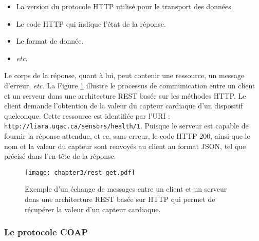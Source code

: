 \begin{itemize}[label=\textbullet]
    \item
        La version du protocole \ac{HTTP} utilisé pour le transport des données.
    \item
        Le code \ac{HTTP} \citep{Fielding2014} qui indique l'état de la réponse.
    \item
        Le format de donnée.
    \item
        \textit{etc.}
\end{itemize}

\noindent Le corps de la réponse, quant à lui, peut contenir une ressource, un message d'erreur, \textit{etc.} La Figure \ref{fig:rest_get} illustre le processus de communication entre un client et un serveur dans une architecture \ac{REST} basée sur les méthodes \ac{HTTP}. Le client demande l'obtention de la valeur du capteur cardiaque d'un dispositif quelconque. Cette ressource est identifiée par l'\ac{URI} : \texttt{http://liara.uqac.ca/sensors/health/1}. Puisque le serveur est capable de fournir la réponse attendue, et ce, sans erreur, le code \ac{HTTP} 200, ainsi que le nom et la valeur du capteur sont renvoyés au client au format \ac{JSON}, tel que précisé dans l'en-tête de la réponse.

\begin{figure}[H]
	\centering
	\texttt{[image: chapter3/rest\_get.pdf]}
        \caption{Exemple d'un échange de messages entre un client et un serveur dans une architecture \ac{REST} basée sur \ac{HTTP} qui permet de récupérer la valeur d'un capteur cardiaque.}
	\label{fig:rest_get}
\end{figure}

\subsubsection{Le protocole \ac{COAP}}

